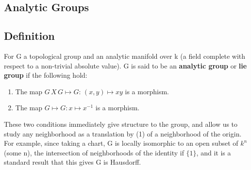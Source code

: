 \subsection{Analytic Groups}\label{df2.2}

\subsection{Definition}\label{df2.2.1}

For G a topological group and an analytic manifold over k (a field
complete with respect to a non-trivial absolute value). G is said
to be an \textbf{analytic group} or \textbf{lie group} if the
following hold:
\begin{enumerate}
    \item The map $G\,X \, G \mapsto G:\,(x,y)\mapsto xy$ is a
    morphism.
    \item The map $G\mapsto G: x\mapsto x^{-1}$ is a morphism.
\end{enumerate}
These two conditions immediately give structure to the group, and
allow us to study any neighborhood as a translation by (1) of a
neighborhood of the origin. For example, since taking a chart, G
is locally isomorphic to an open subset of $k^n$ (some n), the
intersection of neighborhoods of the identity if $\{ 1\}$, and it
is a standard result that this gives G is Hausdorff.

